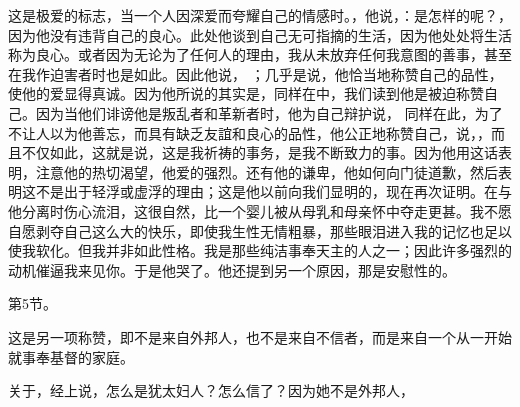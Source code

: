 这是极爱的标志，当一个人因深爱而夸耀自己的情感时。，他说，：是怎样的呢？，因为他没有违背自己的良心。此处他谈到自己无可指摘的生活，因为他处处将生活称为良心。或者因为无论为了任何人的理由，我从未放弃任何我意图的善事，甚至在我作迫害者时也是如此。因此他说， ；几乎是说，他恰当地称赞自己的品性，使他的爱显得真诚。因为他所说的其实是，同样在中，我们读到他是被迫称赞自己。因为当他们诽谤他是叛乱者和革新者时，他为自己辩护说， 同样在此，为了不让人以为他善忘，而具有缺乏友誼和良心的品性，他公正地称赞自己，说，，而且不仅如此，这就是说，这是我祈祷的事务，是我不断致力的事。因为他用这话表明，注意他的热切渴望，他爱的强烈。还有他的谦卑，他如何向门徒道歉，然后表明这不是出于轻浮或虚浮的理由；这是他以前向我们显明的，现在再次证明。在与他分离时伤心流泪，这很自然，比一个婴儿被从母乳和母亲怀中夺走更甚。我不愿自愿剥夺自己这么大的快乐，即使我生性无情粗暴，那些眼泪进入我的记忆也足以使我软化。但我并非如此性格。我是那些纯洁事奉天主的人之一；因此许多强烈的动机催逼我来见你。于是他哭了。他还提到另一个原因，那是安慰性的。\par

第5节。 \par

这是另一项称赞，即不是来自外邦人，也不是来自不信者，而是来自一个从一开始就事奉基督的家庭。\par

 \par

关于，经上说，怎么是犹太妇人？怎么信了？因为她不是外邦人， \par

 \par


